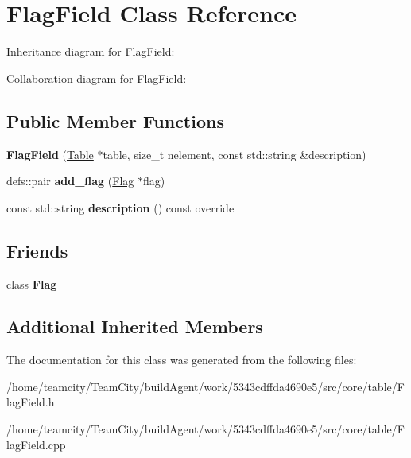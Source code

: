 \hypertarget{classFlagField}{}\section{Flag\+Field Class Reference}
\label{classFlagField}


Inheritance diagram for Flag\+Field\+:


Collaboration diagram for Flag\+Field\+:
\subsection*{Public Member Functions}
\begin{DoxyCompactItemize}
\item 
{\bfseries Flag\+Field} (\hyperlink{classTable}{Table} $\ast$table, size\+\_\+t nelement, const std\+::string \&description)\hypertarget{classFlagField_af1cf5752d23bee71cad1e8f9e5c0d90c}{}\label{classFlagField_af1cf5752d23bee71cad1e8f9e5c0d90c}

\item 
defs\+::pair {\bfseries add\+\_\+flag} (\hyperlink{classFlag}{Flag} $\ast$flag)\hypertarget{classFlagField_a288b67beb33841ecdb06f3af772682d1}{}\label{classFlagField_a288b67beb33841ecdb06f3af772682d1}

\item 
const std\+::string {\bfseries description} () const override\hypertarget{classFlagField_adba81577f60c7b80923394a5437234fa}{}\label{classFlagField_adba81577f60c7b80923394a5437234fa}

\end{DoxyCompactItemize}
\subsection*{Friends}
\begin{DoxyCompactItemize}
\item 
class {\bfseries Flag}\hypertarget{classFlagField_a3c61b282d6d35a5f37ea21d544b6a633}{}\label{classFlagField_a3c61b282d6d35a5f37ea21d544b6a633}

\end{DoxyCompactItemize}
\subsection*{Additional Inherited Members}


The documentation for this class was generated from the following files\+:\begin{DoxyCompactItemize}
\item 
/home/teamcity/\+Team\+City/build\+Agent/work/5343cdffda4690e5/src/core/table/Flag\+Field.\+h\item 
/home/teamcity/\+Team\+City/build\+Agent/work/5343cdffda4690e5/src/core/table/Flag\+Field.\+cpp\end{DoxyCompactItemize}
